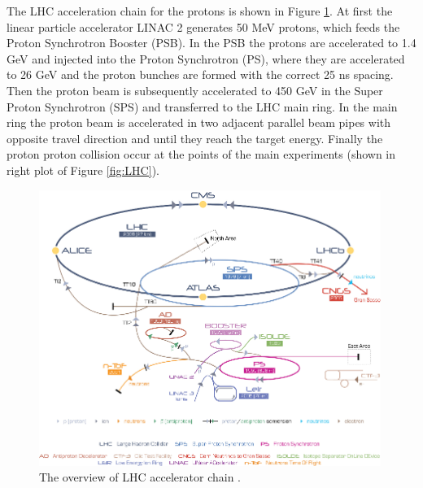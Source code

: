 The LHC acceleration chain for the protons is shown in Figure \ref{fig:LHC_chain}. At first the linear particle accelerator LINAC 2 generates 50 MeV protons, which feeds the Proton Synchrotron Booster (PSB). In the PSB the protons are accelerated to 1.4 GeV and injected into the Proton Synchrotron (PS), where they are accelerated to 26 GeV and the proton bunches are formed with the correct 25 ns spacing. Then the proton beam is subsequently accelerated to 450 GeV in the Super Proton Synchrotron (SPS) and transferred to the LHC main ring. In the main ring the proton beam is accelerated in two adjacent parallel beam pipes with opposite travel direction and until they reach the target energy. Finally the proton proton collision occur at the points of the main experiments (shown in right plot of Figure \ref{fig:LHC}).
\begin{figure}[h!]
\begin{center}
\includegraphics[width=0.99\textwidth]{figures/LHC/lhc_accelerator_chain.png}
\caption{The overview of LHC accelerator chain \cite{CERN_WEB}.}
\label{fig:LHC_chain}
\end{center}
\end{figure}
